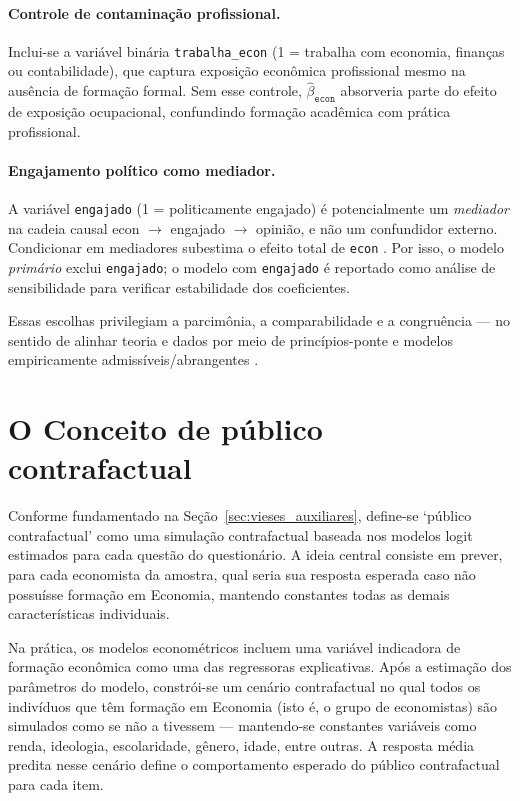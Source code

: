 \paragraph{Controle de contaminação profissional.}
Inclui-se a variável binária \texttt{trabalha\_econ} (1 = trabalha com economia, finanças ou contabilidade), que captura exposição econômica profissional mesmo na ausência de formação formal. Sem esse controle, $\hat{\beta}_\texttt{econ}$ absorveria parte do efeito de exposição ocupacional, confundindo formação acadêmica com prática profissional.

\paragraph{Engajamento político como mediador.}
A variável \texttt{engajado} (1 = politicamente engajado) é potencialmente um \emph{mediador} na cadeia causal econ $\to$ engajado $\to$ opinião, e não um confundidor externo. Condicionar em mediadores subestima o efeito total de \texttt{econ} \citep{angrist2009}. Por isso, o modelo \emph{primário} exclui \texttt{engajado}; o modelo com \texttt{engajado} é reportado como análise de sensibilidade para verificar estabilidade dos coeficientes.

Essas escolhas privilegiam a parcimônia, a comparabilidade e a congruência — no sentido de alinhar teoria e dados por meio de princípios-ponte e modelos empiricamente admissíveis/abrangentes \cite{stigum2003,hausman2008}.


\section{O Conceito de público contrafactual}
\label{sec:publico_esclarecido}

Conforme fundamentado na Seção~\ref{sec:vieses_auxiliares}, define-se ‘público contrafactual’ como uma simulação contrafactual baseada nos modelos logit estimados para cada questão do questionário. A ideia central consiste em prever, para cada economista da amostra, qual seria sua resposta esperada caso não possuísse formação em Economia, mantendo constantes todas as demais características individuais.

Na prática, os modelos econométricos incluem uma variável indicadora de formação econômica como uma das regressoras explicativas. Após a estimação dos parâmetros do modelo, constrói-se um cenário contrafactual no qual todos os indivíduos que têm formação em Economia (isto é, o grupo de economistas) são simulados como se não a tivessem — mantendo-se constantes variáveis como renda, ideologia, escolaridade, gênero, idade, entre outras. A resposta média predita nesse cenário define o comportamento esperado do público contrafactual para cada item.

